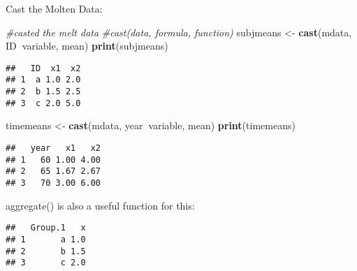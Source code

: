 \documentclass[]{book}
\newenvironment{Shaded}{\begin{snugshade}}{\end{snugshade}}
\newcommand{\KeywordTok}[1]{\textcolor[rgb]{0.13,0.29,0.53}{\textbf{#1}}}
\newcommand{\DataTypeTok}[1]{\textcolor[rgb]{0.13,0.29,0.53}{#1}}
\newcommand{\StringTok}[1]{\textcolor[rgb]{0.31,0.60,0.02}{#1}}
\newcommand{\CommentTok}[1]{\textcolor[rgb]{0.56,0.35,0.01}{\textit{#1}}}
\newcommand{\OperatorTok}[1]{\textcolor[rgb]{0.81,0.36,0.00}{\textbf{#1}}}
\newcommand{\NormalTok}[1]{#1}
\theoremstyle{definition}
\theoremstyle{definition}
\theoremstyle{definition}
\theoremstyle{remark}
\begin{document}
Cast the Molten Data:

\begin{Shaded}
\begin{Highlighting}[]
\CommentTok{#casted the melt data}
\CommentTok{#cast(data, formula, function) }
\NormalTok{subjmeans <-}\StringTok{ }\KeywordTok{cast}\NormalTok{(mdata, ID}\OperatorTok{~}\NormalTok{variable, mean)}
\KeywordTok{print}\NormalTok{(subjmeans)}
\end{Highlighting}
\end{Shaded}

\begin{verbatim}
##   ID  x1  x2
## 1  a 1.0 2.0
## 2  b 1.5 2.5
## 3  c 2.0 5.0
\end{verbatim}

\begin{Shaded}
\begin{Highlighting}[]
\NormalTok{timemeans <-}\StringTok{ }\KeywordTok{cast}\NormalTok{(mdata, year}\OperatorTok{~}\NormalTok{variable, mean)}
\KeywordTok{print}\NormalTok{(timemeans)}
\end{Highlighting}
\end{Shaded}

\begin{verbatim}
##   year   x1   x2
## 1   60 1.00 4.00
## 2   65 1.67 2.67
## 3   70 3.00 6.00
\end{verbatim}

aggregate() is also a useful function for this:

\begin{Shaded}
\end{Shaded}

\begin{verbatim}
##   Group.1   x
## 1       a 1.0
## 2       b 1.5
## 3       c 2.0
\end{verbatim}

\begin{Shaded}
\end{Shaded}
\end{document}
